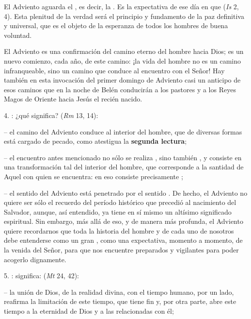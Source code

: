 \begin{body}
	El Adviento aguarda el , es decir, la . Es la expectativa de ese día en que  (\emph{Is} 2, 4). Esta plenitud de la verdad será el principio y fundamento de la paz definitiva y universal, que es el objeto de la esperanza de todos los hombres de buena voluntad. 
	
	El Adviento es una confirmación del camino eterno del hombre hacia Dios; es un nuevo comienzo, cada año, de este camino: ¡la vida del hombre no es un camino infranqueable, sino un camino que conduce al encuentro con el Señor! Hay también en esta invocación del primer domingo de Adviento casi un anticipo de esos caminos que en la noche de Belén conducirán a los pastores y a los Reyes Magos de Oriente hacia Jesús el recién nacido. 
	
	4. : ¿qué significa?  (\emph{Rm} 13, 14): 
	
	-- el camino del Adviento conduce al interior del hombre, que de diversas formas está cargado de pecado, como atestigua la \textbf{segunda lectura}; 
	
	-- el encuentro antes mencionado no sólo se realiza , sino también , y consiste en una transformación tal del interior del hombre, que corresponde a la santidad de Aquel con quien se encuentra: en eso consiste precisamente ; 
	
	-- el sentido  del Adviento está penetrado por el sentido . De hecho, el Adviento no quiere ser sólo el recuerdo del período histórico que precedió al nacimiento del Salvador, aunque, así entendido, ya tiene en sí mismo un altísimo significado espiritual. Sin embargo, más allá de eso, y de manera más profunda, el Adviento quiere recordarnos que toda la historia del hombre y de cada uno de nosotros debe entenderse como un gran , como una expectativa, momento a momento, de la venida del Señor, para que nos encuentre preparados y vigilantes para poder acogerlo dignamente. 
	
	5. : significa:  (\emph{Mt} 24, 42): 
	
	-- la unión de Dios, de la realidad divina, con el tiempo humano, por un lado, reafirma la limitación de este tiempo, que tiene fin y, por otra parte, abre este tiempo a la eternidad de Dios y a las  relacionadas con él; 
	

\end{body}
